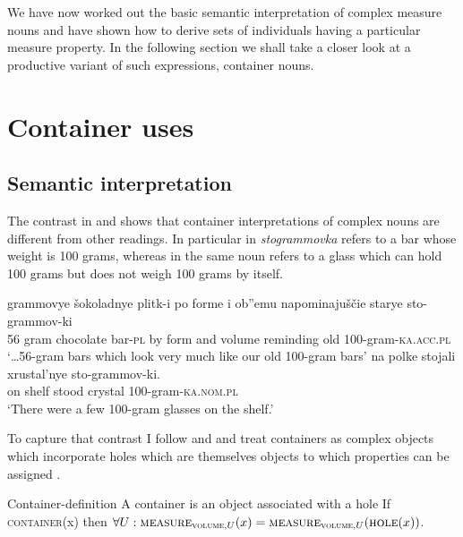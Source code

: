 \documentclass[output=paper,
colorlinks,
citecolor=brown,
newtxmath
]{langscibook}
\begin{document}
\noindent We have now worked out the basic semantic interpretation of complex measure nouns and have shown how to derive sets of individuals having a particular measure property. In the following section we shall take a closer look at a productive variant of such expressions, container nouns.

%
%

\section{Container uses}\label{sec:4}
\subsection{Semantic interpretation}\label{sec:4.1}

The contrast in  and  shows that container interpretations of complex nouns are different from other readings. In particular in  \textit{stogrammovka} refers to a bar whose weight is 100 grams, whereas in  the same noun refers to a glass which can hold 100 grams but does not weigh 100 grams by itself.

\ea\label{ex:20}
    \ea\label{ex:20a}  grammovye šokoladnye plitk-i po forme i ob''emu napominajuščie starye sto-grammov-ki\\
    56 gram chocolate bar-\textsc{pl} by form and volume reminding old 100-gram-\textsc{ka.acc.pl}\\
    \glt `\dots 56-gram bars which look very much like our old 100-gram bars'
    \ex\label{ex:20b} \gll na polke stojali xrustal'nye sto-grammov-ki.\\
    on shelf stood crystal 100-gram-\textsc{ka.nom.pl}\\
    \glt `There were a few 100-gram glasses on the shelf.'
\z\z

\noindent To capture that contrast I follow \citet{Casati.Varzi1999} and \citet{Rothstein2009,Rothstein2017} and treat containers as complex objects which incorporate holes which are themselves objects to which properties can be assigned .

    \largerpage[2] %

\ea\label{ex:21} Container-definition \hfill \citep[218]{Rothstein2017}
    \ea\label{ex:21a} A container is an object associated with a hole
    \ex\label{ex:21b} If \textsc{container}(x) then $\forall U: \textsc{measure}_{\textsc{volume},U}(x) = \textsc{measure}_{\textsc{volume},U}(\textsc{hole}(x))$.
\z\z
\end{document}
